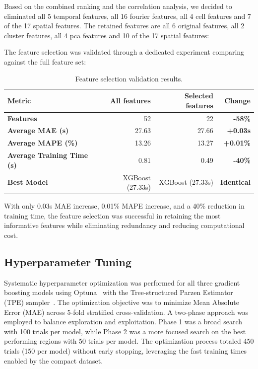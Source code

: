 Based on the combined ranking and the correlation analysis, we decided to eliminated all 5 temporal features, all 16 fourier features, all 4 cell features and 7 of the 17 spatial features.
The retained features are all 6 original features, all 2 cluster features, all 4 pca features and 10 of the 17 spatial features:

The feature selection was validated through a dedicated experiment comparing against the full feature set:

\begin{table}[htbp]
    \centering
    \caption{Feature selection validation results.}
    \label{tab:feature_selection_validation}
    \begin{tabular}{lrrr}
        \toprule
        \textbf{Metric} & \textbf{All features} & \textbf{Selected features} & \textbf{Change} \\
        \midrule
        \textbf{Features} & 52 & 22 & \textbf{-58\%} \\
        \textbf{Average MAE (s)} & 27.63 & 27.66 & \textbf{+0.03s} \\
        \textbf{Average MAPE (\%)} & 13.26 & 13.27 & \textbf{+0.01\%} \\
        \textbf{Average Training Time (s)} & 0.81 & 0.49 & \textbf{-40\%} \\
        \textbf{Best Model} & XGBoost (27.33s) & XGBoost (27.33s) & \textbf{Identical} \\
        \bottomrule
    \end{tabular}
\end{table}

With only 0.03s MAE increase, 0.01\% MAPE increase, and a 40\% reduction in training time, the feature selection was successful in retaining the most informative features while eliminating redundancy and reducing computational cost.

\subsection{Hyperparameter Tuning}
Systematic hyperparameter optimization was performed for all three gradient boosting models using Optuna~\cite{akiba2019optuna} with the Tree-structured Parzen Estimator (TPE) sampler~\cite{bergstra2011algorithms}.
The optimization objective was to minimize Mean Absolute Error (MAE) across 5-fold stratified cross-validation.
A two-phase approach was employed to balance exploration and exploitation. Phase 1 was a broad search with 100 trials per model, while Phase 2 was a more focused search on the best performing regions with 50 trials per model.
The optimization process totaled 450 trials (150 per model) without early stopping, leveraging the fast training times enabled by the compact dataset.


